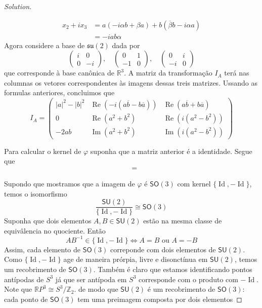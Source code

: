 \begin{proof}[Solution]
\begin{enumerate}[label=\alph*.]
\begin{align*}
	x_2+ix_3&=a(-i \alpha b+\beta a)+b(\overline{\beta}b-i\alpha a)\\
	&=-iab \alpha
\end{align*}
Agora considere a base de $\mathfrak{su}(2)$ dada por
\[\begin{pmatrix} i&0\\0&-i \end{pmatrix},\quad \begin{pmatrix} 0&1\\-1&0 \end{pmatrix} ,\quad \begin{pmatrix} 0&i\\-i&0 \end{pmatrix}  \]
que corresponde à base canônica de $\mathbb{R}^{3}$. A matriz da transformação $I_A$  terá nas columnas os vetores correspondentes às imagens dessas treis matrizes. Ussando as formulas anteriores, concluimos que
\[I_A=\begin{pmatrix} |a|^2-|b|^2 & \operatorname{Re}(-i(a\overline{b}-b \overline{a}))& \operatorname{Re}(a \overline{b}+b \overline{a})\\
0 & \operatorname{Re}(a^2+b^2)& \operatorname{Re}(i(a^2-b^2)) \\
-2ab& \operatorname{Im}(a^2+b^2)&\operatorname{Im}(i(a^2-b^2))\end{pmatrix} \]
\end{enumerate}
Para calcular o kernel de $\varphi$ suponha que a matriz anterior é a identidade. Segue que
\begin{align*}
	&=
\end{align*}

\item Supondo que mostramos que a imagem de $\varphi$ é $\mathsf{SO}(3)$ com kernel $\{\operatorname{Id},-\operatorname{Id}\}$, temos o isomorfismo
	\[\dfrac{\mathsf{SU}(2)}{\{\operatorname{Id},-\operatorname{Id}\}}\cong \mathsf{SO}(3)\]
Suponha que dois elementos $A,B \in\mathsf{SU}(2)$ estão na mesma classe de equivâlencia no quociente. Então
\[AB^{-1}\in\{\operatorname{Id},-\operatorname{Id}\}\iff A=B \text{ ou }A=-B \]
Assim, cada elemento de $\mathsf{SO}(3)$ correponde com dois elementos de $\mathsf{SU}(2)$. Como $\{\operatorname{Id},-\operatorname{Id}\}$ age de maneira prórpia, livre e disonctínua em $\mathsf{SU}(2)$, temos um recobrimento de $\mathsf{SO}(3)$. Também é claro que estamos identificando pontos antípodas de $S^3$ já que ser antípoda em $S^3$ corresponde com o produto com $-\operatorname{Id}$. Note que $\mathbb{R}P^{3}\cong S^3/\mathbb{Z}_2$.
	de modo que $\mathsf{SU}(2)$ é um recobrimento de $\mathsf{SO}(3)$: cada ponto de $\mathsf{SO}(3)$ tem uma preimagem composta por dois elementos
\end{proof}

